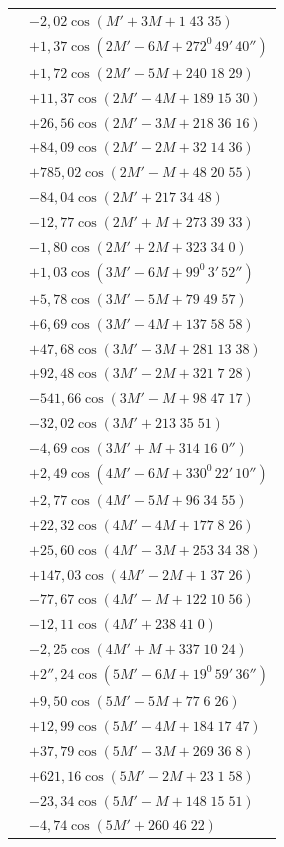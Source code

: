 \begin{landscape}
\begin{longtable}{@{}r@{}l@{}}
&\(-2{,}02\cos(M'+3M+1\;43\;35)\)\\[3pt]
&\(+1{,}37\cos(2M'-6M+272^0\,49'\,40'')\)\\
&\(+1{,}72\cos(2M'-5M+240\;18\;29)\)\\
&\(+11{,}37\cos(2M'-4M+189\;15\;30)\)\\
&\(+26{,}56\cos(2M'-3M+218\;36\;16)\)\\
&\(+84{,}09\cos(2M'-2M+32\;14\;36)\)\\
&\(+785{,}02\cos(2M'-M+48\;20\;55)\)\\
&\(-84{,}04\cos(2M'+217\;34\;48)\)\\
&\(-12{,}77\cos(2M'+M+273\;39\;33)\)\\
&\(-1{,}80\cos(2M'+2M+323\;34\;0)\)\\[3pt]
&\(+1{,}03\cos(3M'-6M+99^0\,3'\,52'')\)\\
&\(+5{,}78\cos(3M'-5M+79\;49\;57)\)\\
&\(+6{,}69\cos(3M'-4M+137\;58\;58)\)\\
&\(+47{,}68\cos(3M'-3M+281\;13\;38)\)\\
&\(+92{,}48\cos(3M'-2M+321\;7\;28)\)\\
&\(-541{,}66\cos(3M'-M+98\;47\;17)\)\\
&\(-32{,}02\cos(3M'+213\;35\;51)\)\\
&\(-4{,}69\cos(3M'+M+314\;16\;0'')\)\\[3pt]
&\(+2{,}49\cos(4M'-6M+330^0\,22'\,10'')\)\\
&\(+2{,}77\cos(4M'-5M+96\;34\;55)\)\\
&\(+22{,}32\cos(4M'-4M+177\;8\;26)\)\\
&\(+25{,}60\cos(4M'-3M+253\;34\;38)\)\\
&\(+147{,}03\cos(4M'-2M+1\;37\;26)\)\\
&\(-77{,}67\cos(4M'-M+122\;10\;56)\)\\
&\(-12{,}11\cos(4M'+238\;41\;0)\)\\
&\(-2{,}25\cos(4M'+M+337\;10\;24)\)\\[3pt]
&\(+2''{,}24\cos(5M'-6M+19^0\,59'\,36'')\)\\
&\(+9{,}50\cos(5M'-5M+77\;6\;26)\)\\
&\(+12{,}99\cos(5M'-4M+184\;17\;47)\)\\
&\(+37{,}79\cos(5M'-3M+269\;36\;8)\)\\
&\(+621{,}16\cos(5M'-2M+23\;1\;58)\)\\
&\(-23{,}34\cos(5M'-M+148\;15\;51)\)\\
&\(-4{,}74\cos(5M'+260\;46\;22)\)\\

\end{longtable}
\end{landscape}
